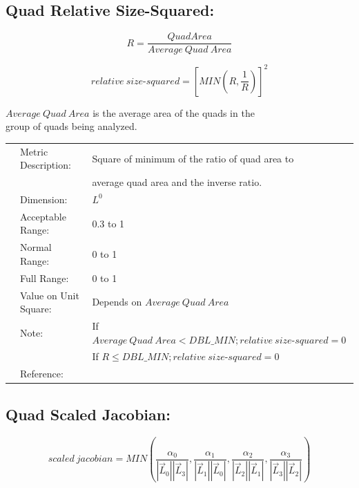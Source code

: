 \documentclass[12pt]{article}
\begin{document}
\subsection*{Quad Relative Size-Squared:}


\begin{displaymath}
R = \frac{Quad Area } {Average~Quad~Area}
\end{displaymath}

\begin{displaymath}
relative~size \textrm{-}squared =  [ MIN( R, \frac {1}{R}) ]^2
\end{displaymath}

\begin{flushleft}
$Average ~ Quad ~ Area$ is the average area of the quads in the \\
group of quads being analyzed. \\
\end{flushleft}

\begin{tabular}{lll}
& Metric Description:  & Square of minimum of the ratio of quad area to  \\
&                      & average quad area and the inverse ratio.\\
& Dimension:           & $L^0$  \\ 
& Acceptable Range:    & 0.3 to 1 \\ 
& Normal Range:        & 0 to 1 \\ 
& Full Range:          & 0 to 1 \\ 
& Value on Unit Square:& Depends on $Average ~ Quad ~ Area$ \\
& Note:                & If $Average~Quad~Area < DBL\_MIN; relative~size \textrm{-}squared = 0$ \\ 
&                      & If $R \leq DBL\_MIN; relative~size \textrm{-}squared = 0$ \\
& Reference:           &  \cite{four} \\
\end{tabular} 


\subsection*{Quad Scaled Jacobian:}

\begin{displaymath}
scaled~jacobian = MIN \left( \frac {\alpha_0} {|\vec L_0| |\vec L_3|}, 
                             \frac {\alpha_1} {|\vec L_1| |\vec L_0|},
                             \frac {\alpha_2} {|\vec L_2| |\vec L_1|},
                             \frac {\alpha_3} {|\vec L_3| |\vec L_2|} \right)
\end{displaymath}
\end{document}

